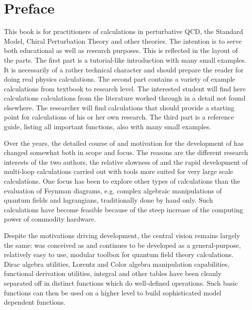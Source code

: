 \section*{Preface}

This book is for practitioners of calculations in perturbative QCD,
the Standard Model, Chiral Perturbation Theory and other theories.
The intention is to serve both educational as well as research purposes.
This is reflected in the layout of the parts.
The first part is a tutorial-like introduction with many small examples.
It is necessarily of a rather technical character and should prepare the
reader for doing real physics calculations.
The second part contains a variety of example calculations from textbook
to research level. The interested student will find here calculations calculations
from the literature worked through in a detail not found elsewhere.
The researcher will find calculations that should provide a starting point
for calculations of his or her own research.
The third part is a reference guide, listing all important functions,
also with many small examples.

Over the years, the detailed course of and motivation for the development of \fc has
changed somewhat both in scope and focus. The reasons are the different research
interests of the two authors, the relative slowness of \mma and the rapid development of
multi-loop calculations carried out with tools \cite{Vermaseren:2000nd, Hahn:1998yk} more suited 
for very large scale calculations.
One focus has been to explore other types of calculations than the evaluation of Feynman
diagrams, e.g. complex algebraic manipulations of quantum fields and lagrangians, traditionally done by hand only.
Such calculations have become feasible because of the steep increase of the computing
power of commodity hardware.

Despite the motivations driving development, the central vision remains largely the same: 
\fc was conceived as and continues to be developed as a general-purpose, relatively easy to use,
modular toolbox for quantum field theory calculations. 
Dirac algebra utilities, Lorentz and Color algebra manipulation capabilities, 
functional derivation utilities, integral and other tables have been cleanly 
separated off in distinct functions which 
do well-defined operations.
Such basic functions can then be used  on a higher level to build sophisticated model dependent functions.

